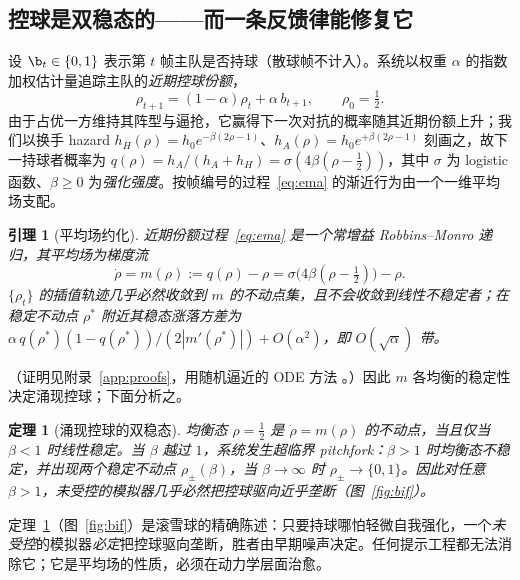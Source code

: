 \documentclass[11pt,UTF8,fontset=fandol]{ctexart}
\theoremstyle{plain}
\newtheorem{theorem}{定理}
\newtheorem{lemma}{引理}
\theoremstyle{definition}
\theoremstyle{remark}
\begin{document}
\subsection{控球是双稳态的——而一条反馈律能修复它}\label{sec:poss}

设 $\b_t\in\{0,1\}$ 表示第 $t$ 帧主队是否持球（散球帧不计入）。系统以权重 $\alpha$ 的指数加权估计量追踪主队的\emph{近期控球份额}，
\begin{equation}\label{eq:ema}
\rho_{t+1}=(1-\alpha)\rho_t+\alpha\,b_{t+1},\qquad\rho_0=\tfrac12 .
\end{equation}
由于占优一方维持其阵型与逼抢，它赢得下一次对抗的概率随其近期份额上升；我们以换手 hazard $h_H(\rho)=h_0e^{-\beta(2\rho-1)}$、$h_A(\rho)=h_0e^{+\beta(2\rho-1)}$ 刻画之，故下一持球者概率为 $q(\rho)=h_A/(h_A+h_H)=\sigma(4\beta(\rho-\tfrac12))$，其中 $\sigma$ 为 logistic 函数、$\beta\ge0$ 为\emph{强化强度}。按帧编号的过程~\eqref{eq:ema} 的渐近行为由一个一维平均场支配。

\begin{lemma}[平均场约化]\label{lem:meanfield}
近期份额过程~\eqref{eq:ema} 是一个常增益 Robbins--Monro 递归，其平均场为梯度流
\begin{equation}\label{eq:meanode}
\dot\rho=m(\rho):=q(\rho)-\rho=\sigma\!\big(4\beta(\rho-\tfrac12)\big)-\rho .
\end{equation}
$\{\rho_t\}$ 的插值轨迹几乎必然收敛到 $m$ 的不动点集，且不会收敛到线性不稳定者；在稳定不动点 $\rho^\ast$ 附近其稳态涨落方差为 $\alpha\,q(\rho^\ast)(1-q(\rho^\ast))/(2|m'(\rho^\ast)|)+O(\alpha^2)$，即 $O(\sqrt\alpha)$ 带。
\end{lemma}

\noindent（证明见附录~\ref{app:proofs}，用随机逼近的 ODE 方法 \citep{benaim1999,kushner2003}。）因此 $m$ 各均衡的稳定性决定涌现控球；下面分析之。

\begin{theorem}[涌现控球的双稳态]\label{thm:bistable}
均衡态 $\rho=\tfrac12$ 是 $\dot\rho=m(\rho)$ 的不动点，当且仅当 $\beta<1$ 时线性稳定。当 $\beta$ 越过 $1$，系统发生超临界 pitchfork：$\beta>1$ 时均衡态不稳定，并出现两个稳定不动点 $\rho_\pm(\beta)$，当 $\beta\to\infty$ 时 $\rho_\pm\to\{0,1\}$。因此对任意 $\beta>1$，未受控的模拟器几乎必然把控球驱向近乎垄断（图~\ref{fig:bif}）。
\end{theorem}

定理~\ref{thm:bistable}（图~\ref{fig:bif}）是滚雪球的精确陈述：只要持球哪怕轻微自我强化，一个\emph{未受控}的模拟器\emph{必定}把控球驱向垄断，胜者由早期噪声决定。任何提示工程都无法消除它；它是平均场的性质，必须在动力学层面治愈。
\end{document}
